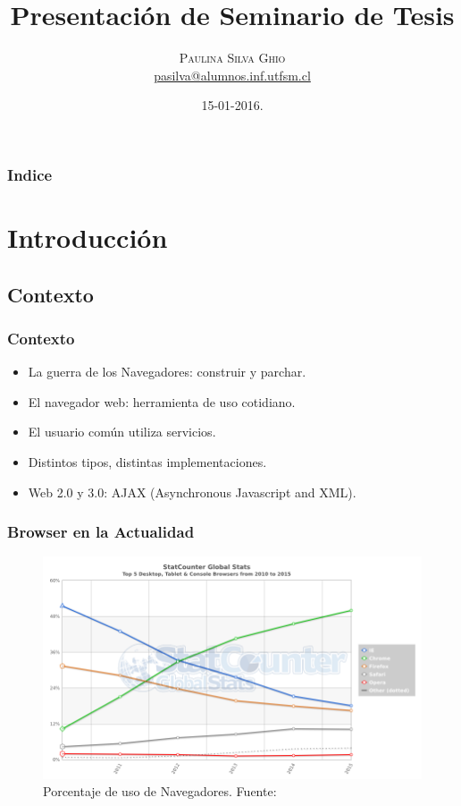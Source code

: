 \documentclass[serif,9pt]{beamer}
\begin{document}
\title{Presentación de Seminario de Tesis} 
\author[Paulina Silva Ghio]{\textsc{Paulina Silva Ghio} \\ \medskip
\small{}
\medskip
\url{pasilva@alumnos.inf.utfsm.cl}}
\institute[]{}
\date{15-01-2016.}

\begin{frame}[plain]
\titlepage
\end{frame}


\begin{frame}
\frametitle{Indice}
\tableofcontents
\end{frame} 


\section{Introducci\'on}
\subsection{Contexto}
\begin{frame}
\frametitle{Contexto}

	\begin{itemize}
		\item La guerra de los Navegadores: construir y parchar.
		\item El navegador web: herramienta de uso cotidiano.
		\item El usuario com\'un utiliza servicios.
		\item Distintos tipos, distintas implementaciones.
		\item Web 2.0 y 3.0: AJAX (Asynchronous Javascript and XML).
	\end{itemize}
\end{frame}


\begin{frame}
\frametitle{Browser en la Actualidad}
	\begin{figure}[h]
	    \centering
	    \includegraphics[width=1\textwidth]{figures/StatCounter-browser-ww-yearly-2010-2015.png}
	    \caption{Porcentaje de uso de Navegadores. Fuente: \cite{statBrow}}
	    \label{fig:UsageShare}
	\end{figure}
\end{frame}
\end{document}
